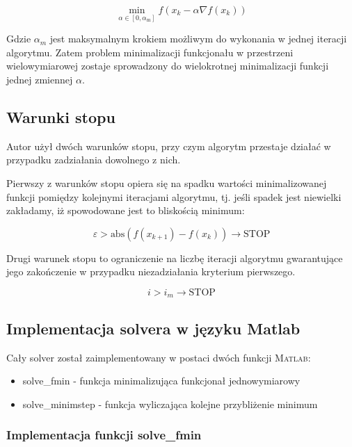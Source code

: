 \documentclass[12pt]{article}
\begin{document}
\begin{equation}
    \min_{\alpha \in [0, \alpha_{\textrm{m}}]} f(x_{k} - \alpha \nabla
    f(x_{k}))
\end{equation}

Gdzie $\alpha_{m}$ jest maksymalnym krokiem możliwym do wykonania w jednej
iteracji algorytmu. Zatem problem minimalizacji funkcjonału w przestrzeni
wielowymiarowej zostaje sprowadzony do wielokrotnej minimalizacji funkcji
jednej zmiennej $\alpha$.

\subsection*{Warunki stopu}

Autor użył dwóch warunków stopu, przy czym algorytm przestaje działać w
przypadku zadziałania dowolnego z nich.

Pierwszy z warunków stopu opiera się na spadku wartości minimalizowanej funkcji
pomiędzy kolejnymi iteracjami algorytmu, tj. jeśli spadek jest niewielki
zakładamy, iż spowodowane jest to bliskością minimum:

\begin{equation}
    \varepsilon > \textrm{abs} (f(x_{k+1}) - f(x_{k})) \rightarrow \textrm{STOP}
\end{equation}

Drugi warunek stopu to ograniczenie na liczbę iteracji algorytmu gwarantujące
jego zakończenie w przypadku niezadziałania kryterium pierwszego.

\begin{equation}
    i > i_{m} \rightarrow \textrm{STOP}
\end{equation}

\subsection*{Implementacja solvera w języku Matlab}

Cały solver został zaimplementowany w postaci dwóch funkcji \textsc{Matlab}:

\begin{itemize}
  \item solve\_fmin - funkcja minimalizująca funkcjonał jednowymiarowy
  \item solve\_minimstep - funkcja wyliczająca kolejne przybliżenie minimum
\end{itemize}

\subsubsection*{Implementacja funkcji solve\_fmin}
\end{document}
